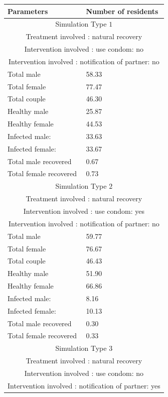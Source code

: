 \documentclass{article}
\begin{document}
\begin{normalsize}
\begin{longtable}{|p{7cm}|p{7cm}|}
		\hline
		Parameters  & Number of residents\\ 
		\hline
		\multicolumn{2}{|c|}{Simulation Type $1$} \\
		\multicolumn{2}{|c|}{Treatment involved : natural recovery} \\
		\multicolumn{2}{|c|}{Intervention involved : use condom: no} \\
		\multicolumn{2}{|c|}{Intervention involved : notification of partner: no} \\
		\hline
		Total male & 58.33\\
		Total female & 77.47\\
		Total couple & 46.30\\
		Healthy male & 25.87\\
		Healthy female & 44.53\\
		Infected male: & 33.63\\
		Infected female: & 33.67\\
		Total male recovered & 0.67\\
		Total female recovered & 0.73\\
		\hline
		\multicolumn{2}{|c|}{Simulation Type $2$} \\
		\multicolumn{2}{|c|}{Treatment involved : natural recovery} \\
		\multicolumn{2}{|c|}{Intervention involved : use condom: yes} \\
		\multicolumn{2}{|c|}{Intervention involved : notification of partner: no} \\
		\hline
		Total male & 59.77\\
		Total female & 76.67\\
		Total couple & 46.43\\
		Healthy male & 51.90\\
		Healthy female & 66.86\\
		Infected male: & 8.16\\
		Infected female: & 10.13\\
		Total male recovered & 0.30\\
		Total female recovered & 0.33\\	
		\hline
		\multicolumn{2}{|c|}{Simulation Type $3$} \\
		\multicolumn{2}{|c|}{Treatment involved : natural recovery} \\
		\multicolumn{2}{|c|}{Intervention involved : use condom: no} \\
		\multicolumn{2}{|c|}{Intervention involved : notification of partner: yes} \\

\end{longtable}
\end{normalsize}
\end{document}

